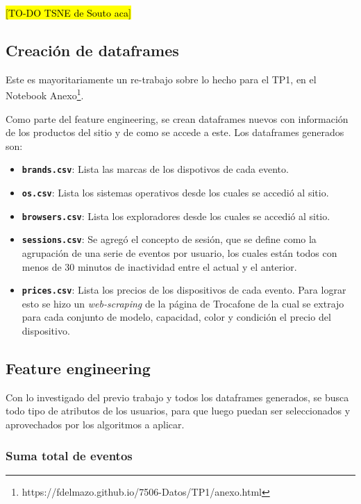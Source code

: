 \documentclass[a4paper]{article}
\begin{document}
\hl{[TO-DO TSNE de Souto aca]}

\subsection{Creación de dataframes}

Este es mayoritariamente un re-trabajo sobre lo hecho para el TP1, en el Notebook Anexo\footnote{https://fdelmazo.github.io/7506-Datos/TP1/anexo.html}.

Como parte del feature engineering, se crean dataframes nuevos con información de los productos del sitio y de como se accede a este. Los dataframes generados son:

\begin{itemize}
	\item \textbf{\texttt{brands.csv}}: Lista las marcas de los dispotivos de cada evento.
	\item \textbf{\texttt{os.csv}}: Lista los sistemas operativos desde los cuales se accedió al sitio.
	\item \textbf{\texttt{browsers.csv}}: Lista los exploradores desde los cuales se accedió al sitio.
	\item \textbf{\texttt{sessions.csv}}:  Se agregó el concepto de sesión, que se define como la agrupación de una serie de eventos por usuario, los cuales están todos con menos de 30 minutos de inactividad entre el actual y el anterior. 
	\item \textbf{\texttt{prices.csv}}: Lista los precios de los dispositivos de cada evento. Para lograr esto se hizo un \textit{web-scraping} de la página de Trocafone de la cual se extrajo para cada conjunto de modelo, capacidad, color y condición el precio del dispositivo.
\end{itemize}

\subsection{Feature engineering}

Con lo investigado del previo trabajo y todos los dataframes generados, se busca todo tipo de atributos de los usuarios, para que luego puedan ser seleccionados y aprovechados por los algoritmos a aplicar.

\subsubsection{Suma total de eventos}

\begin{sloppypar}
\texttt{}
\end{sloppypar}
\end{document}

